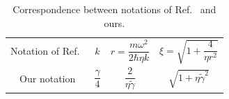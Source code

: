 \documentclass[aps,pra,superscriptaddress,twocolumn
]{revtex4-2}
\begin{document}
 \begin{table}[h]
   \begin{ruledtabular}
   \begin{tabular}{cccc}
  Notation of Ref.~\cite{PhysRevA.60.2700} & $k$ & $r=\dfrac{m\omega^2}{2\hbar \eta k}$ 
     & $\xi = \sqrt{1+ \dfrac{4}{\eta r^2}}$\\
  Our notation & $\dfrac{\gamma}{4}$ & $\dfrac{2}{\eta \tilde \gamma}$ & $\sqrt{1+\eta \tilde \gamma^2}$
   \end{tabular}
   \end{ruledtabular}
   \caption{\label{tab:correspondence} 
  Correspondence between notations of Ref.~\cite{PhysRevA.60.2700} and ours.}
 \end{table}
\end{document}
